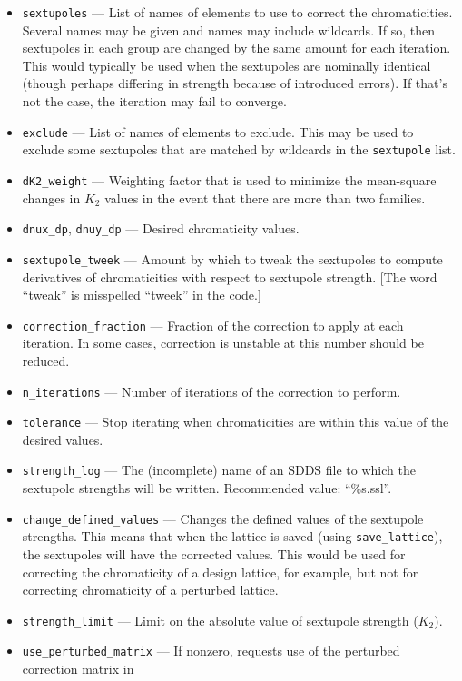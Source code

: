 \documentclass[11pt]{article}
\begin{document}
\begin{itemize}
\item \verb|sextupoles| --- List of names of elements to use to correct the chromaticities.  Several names may be given and names may include
  wildcards. If so, then sextupoles in each group are changed by the same amount for each iteration.
  This would typically be used when the sextupoles are nominally identical (though perhaps differing in strength because of
  introduced errors). If that's not the case, the iteration may fail to converge.
\item \verb|exclude| --- List of names of elements to exclude. This may be used to exclude some sextupoles that are matched by wildcards in
  the \verb|sextupole| list.
\item \verb|dK2_weight| --- Weighting factor that is used to minimize the mean-square changes in $K_2$ values in the
  event that there are more than two families.
\item \verb|dnux_dp|, \verb|dnuy_dp| --- Desired chromaticity values.
\item \verb|sextupole_tweek| --- Amount by which to tweak the sextupoles to compute derivatives of
chromaticities with respect to sextupole strength.  [The word ``tweak'' is misspelled ``tweek'' in the code.]
\item \verb|correction_fraction| --- Fraction of the correction to apply at each iteration.  In some
cases, correction is unstable at this number should be reduced.
\item \verb|n_iterations| --- Number of iterations of the correction to perform.
\item \verb|tolerance| --- Stop iterating when chromaticities are within this value of the
desired values.
\item \verb|strength_log| --- The (incomplete) name of an SDDS file to which the sextupole strengths will
be written.  Recommended value: ``\%s.ssl''.
\item \verb|change_defined_values| --- Changes the defined values of the sextupole strengths.
This means that when the lattice is saved (using \verb|save_lattice|), the sextupoles will
have the corrected values.  This would be used for correcting the chromaticity of a design
lattice, for example, but not for correcting chromaticity of a perturbed lattice.
\item \verb|strength_limit| --- Limit on the absolute value of sextupole strength ($K_2$).
\item \verb|use_perturbed_matrix| --- If nonzero, requests use of the perturbed correction matrix in

\end{itemize}
\end{document}
